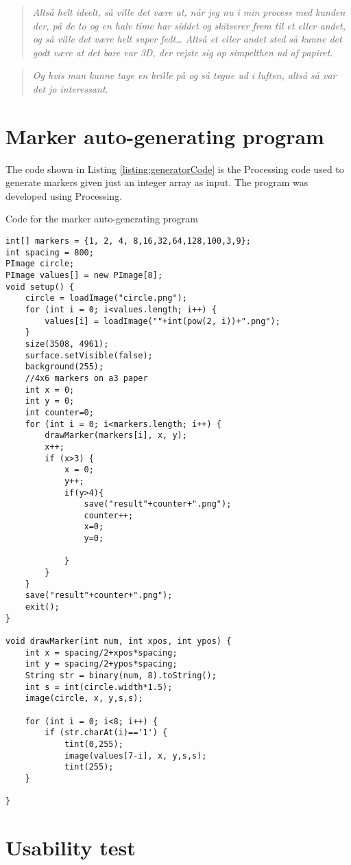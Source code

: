 \begin{quote}
	\textit{Altså helt ideelt, så ville det være at, når jeg nu i min process med kunden der, på de to og en halv time har siddet og skitserer frem til et eller andet, og så ville det være helt super fedt… Altså et eller andet sted så kunne det godt være at det bare var 3D, der rejste sig op simpelthen ud af papiret}\label{quote:expertIdeas3Danish}.\\
\end{quote}

\begin{quote}
	\textit{Og hvis man kunne tage en brille på og så tegne ud i luften, altså så var det jo interessant}\label{quote:expertIdeas4Danish}.\\
\end{quote}



\section{Marker auto-generating program}
The code shown in Listing \ref{listing:generatorCode} is the Processing code used to generate markers given just an integer array as input. The program was developed using Processing.

\begin{listing}[H]
	\caption{Code for the marker auto-generating program}
	\label{listing:generatorCode}
	\begin{verbatim}
int[] markers = {1, 2, 4, 8,16,32,64,128,100,3,9};
int spacing = 800;
PImage circle;
PImage values[] = new PImage[8];
void setup() {
	circle = loadImage("circle.png");
	for (int i = 0; i<values.length; i++) {
		values[i] = loadImage(""+int(pow(2, i))+".png");
	}
	size(3508, 4961);
	surface.setVisible(false);
	background(255);
	//4x6 markers on a3 paper
	int x = 0;
	int y = 0;
	int counter=0;
	for (int i = 0; i<markers.length; i++) {
		drawMarker(markers[i], x, y);
		x++;
		if (x>3) {
			x = 0;
			y++;
			if(y>4){
				save("result"+counter+".png");
				counter++;
				x=0;
				y=0;
				
			}
		}
	}
	save("result"+counter+".png");
	exit();
}

void drawMarker(int num, int xpos, int ypos) {
	int x = spacing/2+xpos*spacing;
	int y = spacing/2+ypos*spacing;
	String str = binary(num, 8).toString();
	int s = int(circle.width*1.5);
	image(circle, x, y,s,s);
	
	for (int i = 0; i<8; i++) {
		if (str.charAt(i)=='1') {
			tint(0,255);
			image(values[7-i], x, y,s,s);
			tint(255); 
	}
	
}
	\end{verbatim}
\end{listing}

\section{Usability test}\label{sec:appendixUsability}
\begin{comment}


\end{comment}

